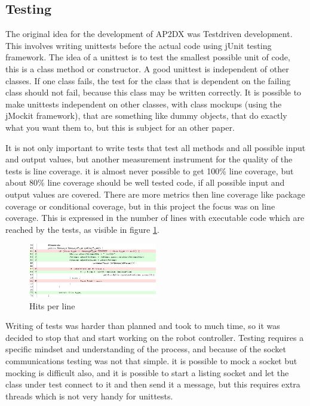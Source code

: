 \documentclass[titlepage, a4paper,10pt]{article}
\begin{document}
\subsection{Testing}
The original idea for the development of AP2DX was Testdriven development. This involves writing unittests before the actual code using jUnit testing framework. The idea of a unittest is to test the smallest possible unit of code, this is a class method or constructor. A good unittest is independent of other classes. If one class fails, the test for the class that is dependent on the failing class should not fail, because this class may be written correctly. It is possible to make unittests independent on other classes, with class mockups (using the jMockit framework), that are something like dummy objects, that do exactly what you want them to, but this is subject for an other paper.

It is not only important to write tests that test all methods and all possible input and output values, but another measurement instrument for the quality of the tests is line coverage. it is almost never possible to get 100\% line coverage, but about 80\% line coverage should be well tested code, if all possible input and output values are covered. There are more metrics then line coverage like package coverage or conditional coverage, but in this project the focus was on line coverage. This is expressed in the number of lines with executable code which are reached by the tests, as visible in figure \ref{fig:hits}.

\begin{figure}[h]
  \centering
    \includegraphics[width=0.5\textwidth]{hits}
  \caption{Hits per line}
  \label{fig:hits}
\end{figure}

Writing of tests was harder than planned and took to much time, so it was decided to stop that and start working on the robot controller. Testing requires a specific mindset and understanding of the process, and because of the socket communications testing was not that simple. it is possible to mock a socket but mocking is difficult also, and it is possible to start a listing socket and let the class under test connect to it and then send it a message, but this requires extra threads which is not very handy for unittests.
\end{document}
